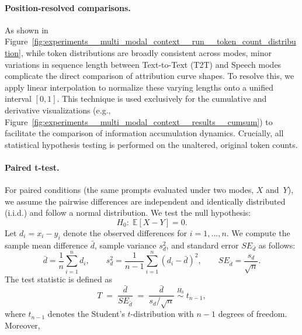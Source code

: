 \paragraph{Position-resolved comparisons.}
As shown in Figure~\ref{fig:experiments__multi_modal_context__run__token_count_distribution}, while token distributions are broadly consistent across modes, minor variations in sequence length between Text-to-Text (T2T) and Speech modes complicate the direct comparison of attribution curve shapes. To resolve this, we apply linear interpolation to normalize these varying lengths onto a unified interval $[0, 1]$. This technique is used exclusively for the cumulative and derivative visualizations (e.g., Figure~\ref{fig:experiments__multi_modal_context__results__cumsum}) to facilitate the comparison of information accumulation dynamics. Crucially, all statistical hypothesis testing is performed on the unaltered, original token counts.

\paragraph{Paired t-test.}
For paired conditions (the same prompts evaluated under two modes, $X$ and~$Y$), we assume the pairwise differences are independent and identically distributed (i.i.d.) and follow a normal distribution. We test the null hypothesis:
\[
H_0:\; \mathbb{E}[X-Y] = 0.
\]
Let $d_i = x_i - y_i$ denote the observed differences for $i=1,\dots,n$. We compute the sample mean difference $\bar{d}$, sample variance $s_d^2$, and standard error $SE_{\bar{d}}$ as follows:
\[
\bar{d}=\frac{1}{n}\sum_{i=1}^{n} d_i,
\qquad
s_d^2=\frac{1}{n-1}\sum_{i=1}^{n}(d_i-\bar{d})^2,
\qquad
SE_{\bar{d}}=\frac{s_d}{\sqrt{n}}.
\]
The test statistic is defined as
\[
T \;=\; \frac{\bar{d}}{SE_{\bar{d}}} \;=\; \frac{\bar{d}}{s_d/\sqrt{n}} \;\overset{H_0}{\sim}\; t_{n-1},
\]
where $t_{n-1}$ denotes the Student's $t$-distribution with $n-1$ degrees of freedom. Moreover,

